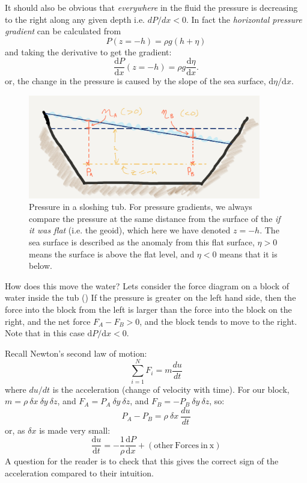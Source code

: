 It should also be obvious that \emph{everywhere} in the fluid the pressure is decreasing to the right along any given depth i.e. $dP/dx<0$.  In fact the \emph{horizontal pressure gradient} can be calculated from
\begin{equation}
P(z=-h) = \rho g (h+\eta)
\end{equation}
and taking the derivative to get the gradient:
\begin{equation}
\frac{\mathrm{d}P}{\mathrm{d}x}(z=-h) = \rho g \frac{\mathrm{d}\eta}{\mathrm{d}x}.
\end{equation}
or, the change in the pressure is caused by the slope of the sea surface, $\mathrm{d}\eta / \mathrm{d}x$.

\begin{figure}[htbp]
\begin{center}
\includegraphics[width=4in]{figs/Bathtub.png}
\caption{Pressure in a sloshing tub.  For pressure gradients, we always compare the pressure at the same distance from the surface of the \emph{if it was flat} (i.e. the geoid), which here we have denoted $z=-h$.  The sea surface is described as the anomaly from this flat surface, $\eta >0 $ means the surface is above the flat level, and $\eta<0$ means that it is below.}
\label{fig:Bathtub}
\end{center}
\end{figure}

How does this move the water?  Lets consider the force diagram on a block of water inside the tub ()  If the pressure is greater on the left hand side, then the force into the block from the left is larger than the force into the block on the right, and the net force $F_{A}-F_{B}>0$, and the block tends to move to the right.  Note that in this case $\mathrm{d}P/\mathrm{d}x<0$.  

Recall Newton's second law of motion:
\begin{equation}
    \sum_{i=1}^{N} F_i = m \frac{du}{dt}
\end{equation}
where $du/dt$ is the acceleration (change of velocity with time).  For our block, $m = \rho\ \delta x\ \delta y\ \delta z$,  and $F_A = P_A \ \delta y\ \delta z$, and $F_B = - P_B \ \delta y\ \delta z$, so:
\begin{equation}
    P_A - P_B = \rho\ \delta x\ \frac{du}{dt}
\end{equation}
or, as $\delta x$ is made very small:
\begin{equation}
\frac{\mathrm{d}u}{\mathrm{d}t} = -\frac{1}{\rho}\frac{\mathrm{d}P}{\mathrm{d}x} + (\mathrm{other\ Forces\ in\ x})
\end{equation}
A question for the reader is to check that this gives the correct sign of the acceleration compared to their intuition.

